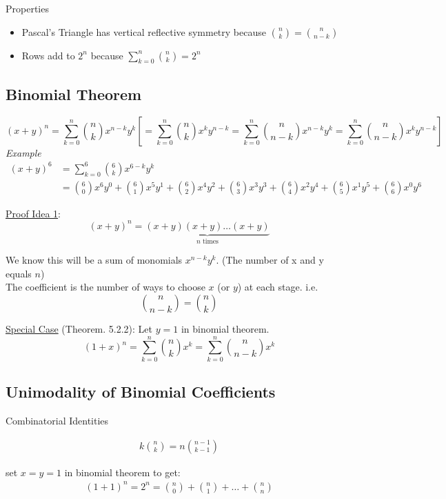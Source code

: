 \documentclass[12pt]{article}
\begin{document}
Properties
\begin{itemize}
    \item Pascal's Triangle has vertical reflective symmetry because $\binom{n}{k}=\binom{n}{n-k}$
    
    \item Rows add to $2^n$ because $\sum\limits_{k=0}^n \binom{n}{k} = 2^n$
\end{itemize}

\subsection{Binomial Theorem}
$$(x+y)^n = \sum\limits_{k=0}^n \binom{n}{k}x^{n-k}y^k \left[= \sum\limits_{k=0}^n \binom{n}{k}x^{k}y^{n-k} =
\sum\limits_{k=0}^n \binom{n}{n-k}x^{n-k}y^k =
\sum\limits_{k=0}^n \binom{n}{n-k}x^{k}y^{n-k}\right]$$
{\sl Example} 
\begin{align*}
    (x+y)^6 &= \sum\limits_{k=0}^6\binom{6}{k}x^{6-k}y^k\\
    &=\binom{6}{0}x^6y^0+\binom{6}{1}x^5y^1+\binom{6}{2}x^4y^2+\binom{6}{3}x^3y^3+\binom{6}{4}x^2y^4+\binom{6}{5}x^1y^5+\binom{6}{6}x^0y^6
\end{align*}

\underline{Proof Idea 1}: 
$$(x+y)^n = \underbrace{(x+y)(x+y)\ldots(x+y)}_{\text{$n$ times}}$$

We know this will be a sum of monomials $x^{n-k}y^k$. (The number of x and y equals $n$)\\

The coefficient is the number of ways to choose $x$ (or $y$) at each stage.
i.e.
$$\binom{n}{n-k}=\binom{n}{k}$$

\vspace{1.5\baselineskip}
\underline{Special Case} (Theorem. 5.2.2): Let $y=1$ in binomial theorem.
$$(1+x)^n = \sum\limits_{k=0}^n \binom{n}{k}x^k = \sum\limits_{k=0}^n \binom{n}{n-k}x^k$$

\vspace{1.5\baselineskip}
\subsection{Unimodality of Binomial Coefficients}
Combinatorial Identities

\begin{align}
    k\binom{n}{k} = n\binom{n-1}{k-1} \tag{5.2}\nonumber
\end{align}

\vspace{1.5\baselineskip}
set $x=y=1$ in binomial theorem to get:
\begin{align}
    (1+1)^n = 2^n=\binom{n}{0} +\binom{n}{1} + \ldots +\binom{n}{n} \tag{5.3} \nonumber
\end{align}
\end{document}
